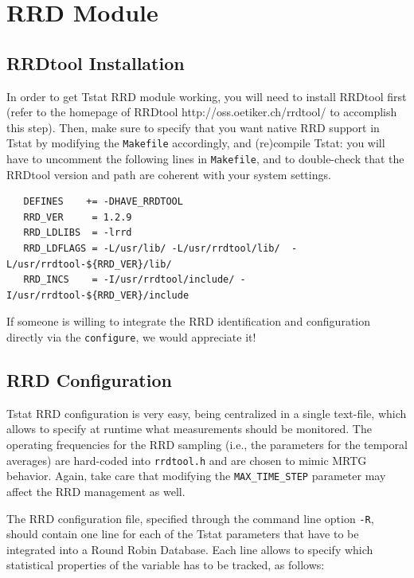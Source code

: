 \documentclass[11pt]{article}
\begin{document}
\section{RRD Module\label{RRD_Module}}
\subsection{RRDtool Installation\label{RRDtool_Installation}}


In order to get Tstat RRD module working, you will need to install RRDtool first
(refer to the homepage of RRDtool \textsf{http://oss.oetiker.ch/rrdtool/}  to accomplish this step).
Then, make sure to specify that you want native RRD support in Tstat by
modifying the \texttt{Makefile} accordingly, and (re)compile Tstat: you will have to
uncomment the following lines in \texttt{Makefile}, and  to double-check
that the RRDtool version and path are coherent with your system settings.

\begin{small}\begin{verbatim}
   DEFINES    += -DHAVE_RRDTOOL
   RRD_VER     = 1.2.9
   RRD_LDLIBS  = -lrrd
   RRD_LDFLAGS = -L/usr/lib/ -L/usr/rrdtool/lib/  -L/usr/rrdtool-${RRD_VER}/lib/
   RRD_INCS    = -I/usr/rrdtool/include/ -I/usr/rrdtool-${RRD_VER}/include
\end{verbatim}\end{small} \noindent
If someone is willing to integrate the RRD identification and configuration
directly via the \texttt{configure}, we would appreciate it!

\subsection{RRD Configuration\label{RRD_Configuration}}


Tstat RRD configuration is very easy, being centralized
in a single text-file, which allows to specify at runtime what measurements
should be monitored. The operating frequencies
for the RRD sampling (i.e., the parameters for the temporal 
averages) are hard-coded into \texttt{rrdtool.h} and are chosen to 
mimic MRTG behavior. Again, take care that modifying the \texttt{MAX\_TIME\_STEP}
parameter may affect the RRD management as well.



The RRD configuration file, specified through the command line option \texttt{-R},
should contain one line for each of the Tstat parameters that have
to be integrated into a Round Robin Database. Each line allows to
specify which statistical properties of the variable has to be tracked,
as follows:
\end{document}
